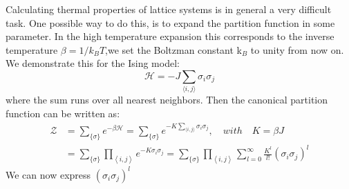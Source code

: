 \documentclass{article}
\begin{document}
Calculating thermal properties of lattice systems is in general a
very difficult task. One possible way to do this, is to expand the
partition function in some parameter. In the high temperature
expansion this corresponds to the inverse temperature $\beta =
1/k_BT$,we set the Boltzman constant k$_B$ to unity from now on.
We demonstrate this for the Ising model:
\begin{equation}
\label{eq:10}
\mathcal{H} = -J \sum\limits_{\langle i,j \rangle} \sigma_i \sigma_j
\end{equation}
where the sum runs over all nearest neighbors. Then the canonical
partition function can be written as:
\begin{align}
\label{eq:11}
\mathcal{Z} &= \sum\limits_{\{ \sigma \}} e^{-\beta \mathcal{H}} =
\sum\limits_{\{ \sigma \}} e^{-K \sum_{\langle i,j \rangle}
  \sigma_i \sigma_j}, \quad with \quad K = \beta J\\
&= \sum\limits_{\{ \sigma \}} \prod\limits_{\left\langle i,j
  \right\rangle} e^{-K \sigma_i \sigma_j} =  \sum\limits_{\{ \sigma \}} \prod\limits_{\left\langle i,j
  \right\rangle} \sum\limits_{l = 0}^{\infty} \frac{K^l}{l!}(\sigma_i
  \sigma_j )^l
\end{align}
We can now express $(\sigma_i \sigma_j)^l$
\end{document}
